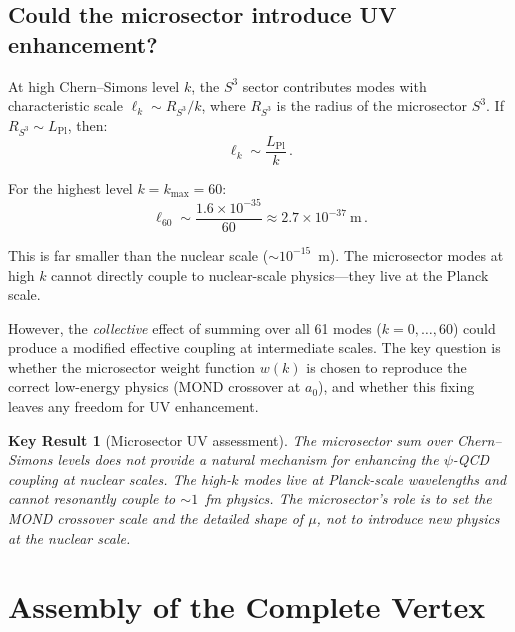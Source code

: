 \documentclass[aps,prd,twocolumn,superscriptaddress,floatfix,nofootinbib]{revtex4-2}
\newcommand{\mufunction}{\mu}
\newtheorem{result}{Key Result}
\begin{document}
\subsection{Could the microsector introduce UV enhancement?}
\label{sec:UV_enhancement}

At high Chern--Simons level $k$, the $S^3$ sector contributes modes with
characteristic scale $\ell_k \sim R_{S^3}/k$, where $R_{S^3}$ is the
radius of the microsector $S^3$. If $R_{S^3} \sim L_{\mathrm{Pl}}$, then:
\begin{equation}
\ell_k \sim \frac{L_{\mathrm{Pl}}}{k} \, .
\end{equation}

For the highest level $k = k_{\max} = 60$:
\begin{equation}
\ell_{60} \sim \frac{1.6 \times 10^{-35}}{60}
\approx 2.7 \times 10^{-37}~\text{m} \, .
\end{equation}

This is far smaller than the nuclear scale ($\sim 10^{-15}$~m). The
microsector modes at high $k$ cannot directly couple to nuclear-scale
physics---they live at the Planck scale.

However, the \emph{collective} effect of summing over all 61 modes
($k = 0, \ldots, 60$) could produce a modified effective coupling at
intermediate scales. The key question is whether the microsector weight
function $w(k)$ is chosen to reproduce the correct low-energy physics
(MOND crossover at $a_0$), and whether this fixing leaves any freedom for
UV enhancement.

\begin{result}[Microsector UV assessment]
The microsector sum over Chern--Simons levels does not provide a natural
mechanism for enhancing the $\psi$-QCD coupling at nuclear scales.
The high-$k$ modes live at Planck-scale wavelengths and cannot resonantly
couple to $\sim 1$~fm physics. The microsector's role is to set the
MOND crossover scale and the detailed shape of $\mufunction$, not to
introduce new physics at the nuclear scale.
\end{result}


\section{Assembly of the Complete Vertex}\label{sec:vertex_assembly}
\end{document}
